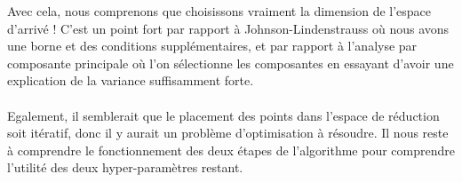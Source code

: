         Avec cela, nous comprenons que choisissons vraiment la dimension de l’espace d’arrivé ! C’est un point fort par rapport à Johnson-Lindenstrauss où nous avons une borne et des conditions supplémentaires, et par rapport à l’analyse par composante principale où l’on sélectionne les composantes en essayant d’avoir une explication de la variance suffisamment forte.
        \\
        \\
        Egalement, il semblerait que le placement des points dans l’espace de réduction soit itératif, donc il y aurait un problème d’optimisation à résoudre. Il nous reste à comprendre le fonctionnement des deux étapes de l’algorithme pour comprendre l’utilité des deux hyper-paramètres restant.








